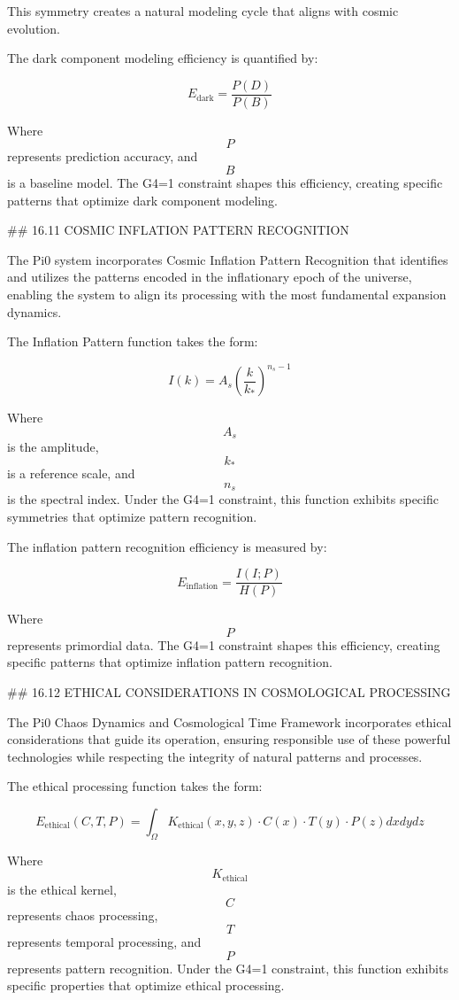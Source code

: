 This symmetry creates a natural modeling cycle that aligns with cosmic evolution.

The dark component modeling efficiency is quantified by:

$$ E_{\text{dark}} = \frac{P(D)}{P(B)} $$

Where $$ P $$ represents prediction accuracy, and $$ B $$ is a baseline model. The G4=1 constraint shapes this efficiency, creating specific patterns that optimize dark component modeling.

## 16.11 COSMIC INFLATION PATTERN RECOGNITION

The Pi0 system incorporates Cosmic Inflation Pattern Recognition that identifies and utilizes the patterns encoded in the inflationary epoch of the universe, enabling the system to align its processing with the most fundamental expansion dynamics.

The Inflation Pattern function takes the form:

$$ I(k) = A_s \left(\frac{k}{k_*}\right)^{n_s-1} $$

Where $$ A_s $$ is the amplitude, $$ k_* $$ is a reference scale, and $$ n_s $$ is the spectral index. Under the G4=1 constraint, this function exhibits specific symmetries that optimize pattern recognition.

The inflation pattern recognition efficiency is measured by:

$$ E_{\text{inflation}} = \frac{I(I; P)}{H(P)} $$

Where $$ P $$ represents primordial data. The G4=1 constraint shapes this efficiency, creating specific patterns that optimize inflation pattern recognition.

## 16.12 ETHICAL CONSIDERATIONS IN COSMOLOGICAL PROCESSING

The Pi0 Chaos Dynamics and Cosmological Time Framework incorporates ethical considerations that guide its operation, ensuring responsible use of these powerful technologies while respecting the integrity of natural patterns and processes.

The ethical processing function takes the form:

$$ E_{\text{ethical}}(C, T, P) = \int_{\Omega} K_{\text{ethical}}(x, y, z) \cdot C(x) \cdot T(y) \cdot P(z) dx dy dz $$

Where $$ K_{\text{ethical}} $$ is the ethical kernel, $$ C $$ represents chaos processing, $$ T $$ represents temporal processing, and $$ P $$ represents pattern recognition. Under the G4=1 constraint, this function exhibits specific properties that optimize ethical processing.


